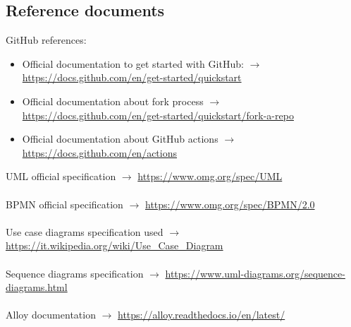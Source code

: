 \documentclass{article}
\begin{document}
{\subsection{Reference documents}
GitHub references:
\begin{itemize}
    \item Official documentation to get started with GitHub: $\rightarrow$ \url{https://docs.github.com/en/get-started/quickstart}
    \item Official documentation about fork process $\rightarrow$ \url{https://docs.github.com/en/get-started/quickstart/fork-a-repo}
    \item Official documentation about GitHub actions $\rightarrow$ \url{https://docs.github.com/en/actions}
\end{itemize}
UML official specification $\rightarrow$ \url{https://www.omg.org/spec/UML}
\\ \\
BPMN official specification $\rightarrow$ \url{https://www.omg.org/spec/BPMN/2.0}
\\ \\
Use case diagrams specification used $\rightarrow$ \url{https://it.wikipedia.org/wiki/Use_Case_Diagram}
\\ \\
Sequence diagrams specification $\rightarrow$ \url{https://www.uml-diagrams.org/sequence-diagrams.html}
\\ \\
Alloy documentation $\rightarrow$ \url{https://alloy.readthedocs.io/en/latest/}

}
\end{document}
